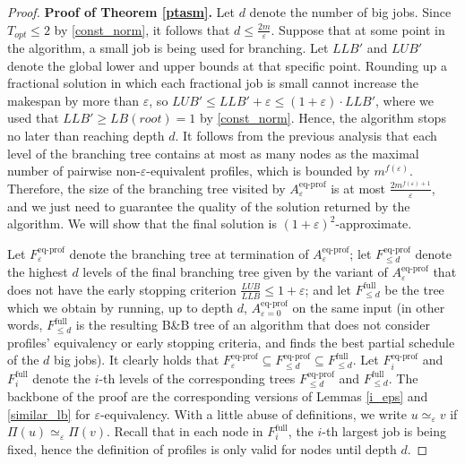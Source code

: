 \documentclass[moor,sglanonrev]{informs4}
\theoremstyle{plain}
\begin{document}
\ptasm

\begin{proof}{\textbf{Proof of Theorem \ref{ptasm}.}}
    Let $d$ denote the number of big jobs. Since $T_{opt}\le 2$ by \eqref{const_norm}, it follows that $d\le \frac{2m}{\varepsilon}$. Suppose that at some point in the algorithm, a small job is being used for branching. Let $LLB'$ and $LUB'$ denote the global lower and upper bounds at that specific point. Rounding up a fractional solution in which each fractional job is small cannot increase the makespan by more than $\varepsilon$, so $LUB' \le LLB' + \varepsilon \le (1+\varepsilon)\cdot LLB'$, where we used that $LLB' \ge LB(root)=1$ by \eqref{const_norm}. Hence, the algorithm stops no later than reaching depth $d$. It follows from the previous analysis that each level of the branching tree contains at most as many nodes as the maximal number of pairwise non-$\varepsilon$-equivalent profiles, which is bounded by $m^{f(\varepsilon)}$. Therefore, the size of the branching tree visited by $A^{\text{eq-prof}}_{\varepsilon}$ is at most $\frac{2m^{f(\varepsilon)+1}}{\varepsilon}$, and we just need to guarantee the quality of the solution returned by the algorithm. We will show that the final solution is $(1+\varepsilon)^2$-approximate.

    Let $F^{\text{eq-prof}}_{\varepsilon}$ denote the branching tree at termination of $A^{\text{eq-prof}}_{\varepsilon}$; let $F^{\text{eq-prof}}_{\le d}$ denote the highest $d$ levels of the final branching tree given by the variant of $A^{\text{eq-prof}}_{\varepsilon}$ that does not have the early stopping criterion $\frac{LUB}{LLB}\le 1+\varepsilon$; and let $F^{\text{full}}_{\le d}$ be the tree which we obtain by running, up to depth $d$, $A^{\text{eq-prof}}_{\varepsilon=0}$ on the same input (in other words, $F^{\text{full}}_{\le d}$ is the resulting B\&B tree of an algorithm that does not consider profiles' equivalency or early stopping criteria, and finds the best partial schedule of the $d$ big jobs). It clearly holds that $F^{\text{eq-prof}}_{\varepsilon} \subseteq F^{\text{eq-prof}}_{\le d} \subseteq F^{\text{full}}_{\le d}$. Let $F^{\text{eq-prof}}_i$ and $F^{\text{full}}_i$ denote the $i$-th levels of the corresponding trees $F^{\text{eq-prof}}_{\le d}$ and $F^{\text{full}}_{\le d}$. The backbone of the proof are the corresponding versions of Lemmas \ref{i_eps} and \ref{similar_lb} for $\varepsilon$-equivalency. With a little abuse of definitions, we write $u \simeq_{\varepsilon} v$ if $\Pi(u) \simeq_{\varepsilon} \Pi(v)$. Recall that in each node in $F^{\text{full}}_i$, the $i$-th largest job is being fixed, hence the definition of profiles is only valid for nodes until depth $d$.  


\end{proof}
\end{document}
